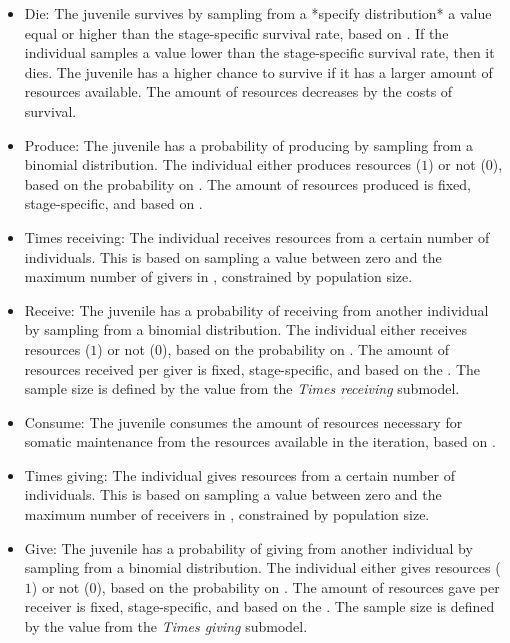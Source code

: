 \documentclass{article}
\begin{document}
\begin{itemize}
    \begin{itemize}
        \item Die: The juvenile survives by sampling from a *specify distribution* a value equal or higher than the stage-specific survival rate, based on \cite{gurven2007longevity}. If the individual samples a value lower than the stage-specific survival rate, then it dies. The juvenile has a higher chance to survive if it has a larger amount of resources available. The amount of resources decreases by the costs of survival.
        \item Produce: The juvenile has a probability of producing by sampling from a binomial distribution. The individual either produces resources ($1$) or not ($0$), based on the probability on \cite{koster2020life}. The amount of resources produced is fixed, stage-specific, and based on \cite{koster2020life}.
        \item Times receiving: The individual receives resources from a certain number of individuals. This is based on sampling a value between zero and the maximum number of givers in \cite{gurven2004give}, constrained by population size.
        \item Receive: The juvenile has a probability of receiving from another individual by sampling from a binomial distribution. The individual either receives resources ($1$) or not ($0$), based on the probability on \cite{gurven2004give}. The amount of resources received per giver is fixed, stage-specific, and based on the \cite{gurven2004give}. The sample size is defined by the value from the \emph{Times receiving} submodel. 
        \item Consume: The juvenile consumes the amount of resources necessary for somatic maintenance from the resources available in the iteration, based on \cite{kaplan2000theory}.
        \item Times giving: The individual gives resources from a certain number of individuals. This is based on sampling a value between zero and the maximum number of receivers in \cite{gurven2004give}, constrained by population size.
        \item Give: The juvenile has a probability of giving from another individual by sampling from a binomial distribution. The individual either gives resources ($1$) or not ($0$), based on the probability on \cite{gurven2004give}. The amount of resources gave per receiver is fixed, stage-specific, and based on the \cite{gurven2004give}. The sample size is defined by the value from the \emph{Times giving} submodel. 

\end{itemize}
\end{itemize}
\end{document}

